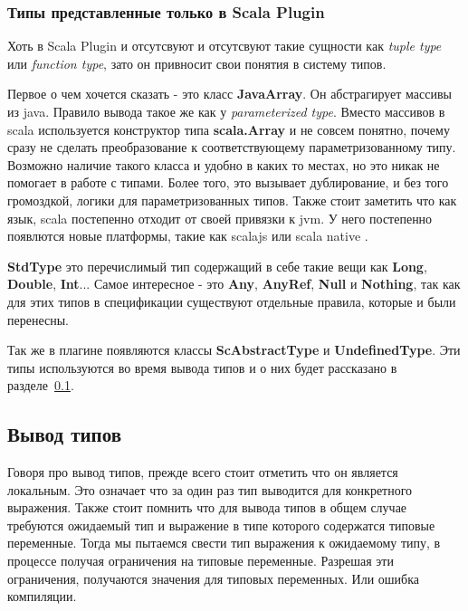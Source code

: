 \subsubsection{Типы представленные только в Scala Plugin}
Хоть в Scala Plugin и отсутсвуют и отсутсвуют такие сущности как
\textit{tuple type} или \textit{function type}, зато он привносит
свои понятия в систему типов.

Первое о чем хочется сказать - это класс \textbf{JavaArray}.
Он абстрагирует массивы из java.
Правило вывода такое же как у \textit{parameterized type}.
Вместо массивов в scala используется конструктор типа \textbf{scala.Array} и
не совсем понятно, почему сразу не сделать преобразование к соответствующему
параметризованному типу.
Возможно наличие такого класса и удобно в каких то местах, но это никак не
помогает в работе с типами.
Более того, это вызывает дублирование, и без того громоздкой, логики для
параметризованных типов.
Также стоит заметить что как язык, scala постепенно отходит от своей привязки к jvm.
У него постепенно появлются новые платформы, такие как scalajs \cite{scalajs}
или scala native \cite{scala_native}.

\textbf{StdType} это перечислимый тип содержащий в себе такие вещи как
\textbf{Long}, \textbf{Double}, \textbf{Int}...
Самое интересное - это \textbf{Any}, \textbf{AnyRef}, \textbf{Null} и
\textbf{Nothing}, так как для этих типов в спецификации существуют отдельные
правила, которые и были перенесны.

Так же в плагине появляются классы \textbf{ScAbstractType} и \textbf{UndefinedType}.
Эти типы используются во время вывода типов и о них будет рассказано в
разделе~\ref{sec:infer}.

\subsection{Вывод типов}
\label{sec:infer}

Говоря про вывод типов, прежде всего стоит отметить что он является локальным.
Это означает что за один раз тип выводится для конкретного выражения.
Также стоит помнить что для вывода типов в общем случае требуются ожидаемый тип
и выражение в типе которого содержатся типовые переменные.
Тогда мы пытаемся свести тип выражения к ожидаемому типу, в процессе получая
ограничения на типовые переменные.
Разрешая эти ограничения, получаются значения для типовых переменных.
Или ошибка компиляции.

